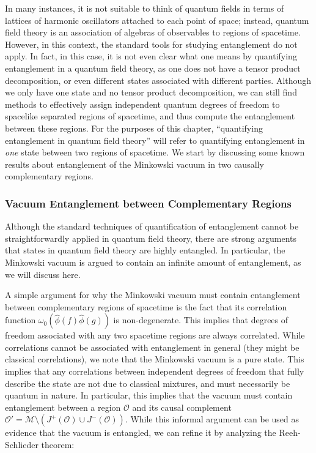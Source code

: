 \documentclass[letterpaper,12pt,titlepage,oneside,final]{book}
\newcommand{\M}{\mathcal{M}}
\begin{document}
In many instances, it is not suitable to think of quantum fields in terms of lattices of harmonic oscillators attached to each point of space; instead, quantum field theory is an association of algebras of observables to regions of spacetime. However, in this context, the standard tools for studying entanglement do not apply. In fact, in this case, it is not even clear what one means by quantifying entanglement in a quantum field theory, as one does not have a tensor product decomposition, or even different states associated with different parties. Although we only have one state and no tensor product decomposition, we can still find methods to effectively assign independent quantum degrees of freedom to spacelike separated regions of spacetime, and thus compute the entanglement between these regions. For the purposes of this chapter,  ``quantifying entanglement in quantum field theory'' will refer to quantifying entanglement in \textit{one} state between two regions of spacetime. We start by discussing some known results about entanglement of the Minkowski vacuum in two causally complementary regions.


\subsubsection*{Vacuum Entanglement between Complementary Regions}

Although the standard techniques of quantification of entanglement cannot be straightforwardly applied in quantum field theory, there are strong arguments that states in quantum field theory are highly entangled. In particular, the Minkowski vacuum is argued to contain an infinite amount of entanglement, as we will discuss here. 

A simple argument for why the Minkowski vacuum must contain entanglement between complementary regions of spacetime is the fact that its correlation function $\omega_0(\hat{\phi}(f)\hat{\phi}(g))$ is non-degenerate. This implies that degrees of freedom associated with any two spacetime regions are always correlated. While correlations cannot be associated with entanglement in general (they might be classical correlations), we note that the Minkowski vacuum is a pure state. This implies that any correlations between independent degrees of freedom that fully describe the state are not due to classical mixtures, and must necessarily be quantum in nature. In particular, this implies that the vacuum must contain entanglement between a region $\mathcal{O}$ and its causal complement $\mathcal{O}' = \M\setminus(J^+(\mathcal{O})\cup J^-(\mathcal{O}))$. While this informal argument can be used as evidence that the vacuum is entangled, we can refine it by analyzing the Reeh-Schlieder theorem:
\end{document}
